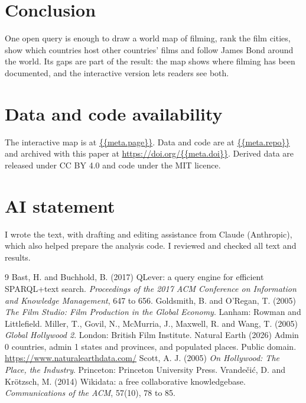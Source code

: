 \documentclass[11pt,a4paper]{article}
\begin{document}
\section{Conclusion}
One open query is enough to draw a world map of filming, rank the film cities, show which countries host other countries' films and follow James Bond around the world. Its gaps are part of the result: the map shows where filming has been documented, and the interactive version lets readers see both.

\section*{Data and code availability}
The interactive map is at \url{{{meta.page}}}. Data and code are at \url{{{meta.repo}}} and archived with this paper at \url{https://doi.org/{{meta.doi}}}. Derived data are released under CC BY 4.0 and code under the MIT licence.

\section*{AI statement}
I wrote the text, with drafting and editing assistance from Claude (Anthropic), which also helped prepare the analysis code. I reviewed and checked all text and results.

\begin{thebibliography}{9}
 Bast, H. and Buchhold, B. (2017) QLever: a query engine for efficient SPARQL+text search. \emph{Proceedings of the 2017 ACM Conference on Information and Knowledge Management}, 647 to 656.
 Goldsmith, B. and O'Regan, T. (2005) \emph{The Film Studio: Film Production in the Global Economy}. Lanham: Rowman and Littlefield.
 Miller, T., Govil, N., McMurria, J., Maxwell, R. and Wang, T. (2005) \emph{Global Hollywood 2}. London: British Film Institute.
 Natural Earth (2026) Admin 0 countries, admin 1 states and provinces, and populated places. Public domain. \url{https://www.naturalearthdata.com/}
 Scott, A. J. (2005) \emph{On Hollywood: The Place, the Industry}. Princeton: Princeton University Press.
 Vrande\v{c}i\'c, D. and Kr\"otzsch, M. (2014) Wikidata: a free collaborative knowledgebase. \emph{Communications of the ACM}, 57(10), 78 to 85.
\end{thebibliography}
\end{document}
